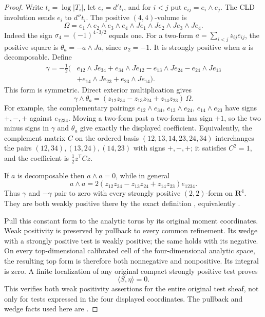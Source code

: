 \documentclass[11pt,a4paper]{article}
\numberwithin{equation}{section}
\theoremstyle{definition}
\theoremstyle{remark}
\begin{document}
\begin{proof}
Write $t_i=\log|T_i|$, let $e_i=d't_i$, and for $i<j$ put
$e_{ij}=e_i\wedge e_j$.  The CLD involution sends $e_i$ to
$d''t_i$.  The positive $(4,4)$-volume is
\[
  \Omega=e_1\wedge e_2\wedge e_3\wedge e_4
                  \wedge Je_1\wedge Je_2\wedge Je_3\wedge Je_4.
\]
Indeed the sign $\sigma_4=(-1)^{4\cdot3/2}$ equals one.
For a two-form $a=\sum_{i<j}z_{ij}e_{ij}$, the positive
square is $\theta_a=-a\wedge Ja$, since $\sigma_2=-1$.
It is strongly positive when $a$ is decomposable.  Define
\[
\begin{split}
 \gamma=-\tfrac12\bigl(&e_{12}\wedge Je_{34}
                       +e_{34}\wedge Je_{12}
                       -e_{13}\wedge Je_{24}
                       -e_{24}\wedge Je_{13}\\
                     &+e_{14}\wedge Je_{23}
                       +e_{23}\wedge Je_{14}\bigr).
\end{split}
\]
This form is symmetric.  Direct exterior multiplication gives
\begin{equation}
       \gamma\wedge\theta_a
        =(z_{12}z_{34}-z_{13}z_{24}+z_{14}z_{23})\,\Omega.
 \label{eq:r5-plucker-square-pairing}
\end{equation}
For example, the complementary pairings
$e_{12}\wedge e_{34}$, $e_{13}\wedge e_{24}$,
$e_{14}\wedge e_{23}$ have signs $+,-,+$ against
$e_{1234}$.  Moving a two-form past a two-form has sign
$+1$, so the two minus signs in $\gamma$ and $\theta_a$
give exactly the displayed coefficient.  Equivalently, the
complement matrix $C$ on the ordered basis
$(12,13,14,23,24,34)$ interchanges the pairs
$(12,34),(13,24),(14,23)$ with signs $+,-,+$; it satisfies
$C^2=1$, and the coefficient is $\tfrac12 z^{\mathsf T}Cz$.

If $a$ is decomposable then $a\wedge a=0$, while in general
\[
 a\wedge a
       =2(z_{12}z_{34}-z_{13}z_{24}+z_{14}z_{23})e_{1234}.
\]
Thus $\gamma$ and $-\gamma$ pair to zero with every strongly
positive $(2,2)$-form on $\mathbf R^4$.  They are both
weakly positive there by the exact definition
\cite[Definition 5.1.1(b)]{CLD12}, equivalently
\cite[Definition 1.2.3(a)]{CLD25}.

Pull this constant form to the analytic torus by its original
moment coordinates.  Weak positivity is preserved by pullback
to every common refinement.  Its wedge with a strongly positive
test is weakly positive; the same holds with its negative.
On every top-dimensional calibrated cell of the four-dimensional
analytic space, the resulting top form is therefore both
nonnegative and nonpositive.  Its integral is zero.  A finite
localization of any original compact strongly positive test
proves
\[
                         \langle S,\eta\rangle=0.
\]
This verifies both weak positivity assertions for the entire
original test sheaf, not only for tests expressed in the four
displayed coordinates.  The pullback and wedge facts used here
are \cite[Lemma 1.2.11 and Proposition 1.2.12]{CLD25}.


\end{proof}
\end{document}
